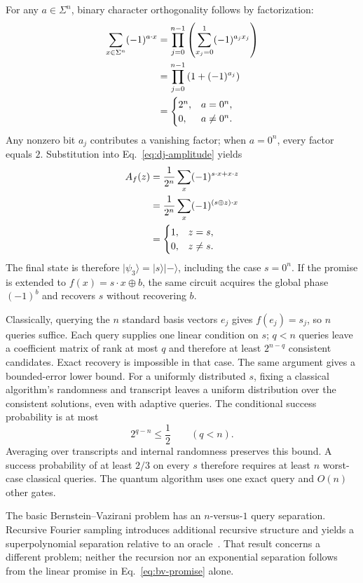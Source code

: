 \documentclass[11pt,oneside,openany]{book}
\providecommand{\ket}{}
\renewcommand{\ket}[1]{\lvert #1\rangle}
\theoremstyle{definition}
\begin{document}
For any $a\in\Sigma^n$, binary character orthogonality follows by factorization:
\begin{align}
 \sum_{x\in\Sigma^n}(-1)^{a\cdot x}
 &=\prod_{j=0}^{n-1}\left(\sum_{x_j=0}^1(-1)^{a_jx_j}\right)\notag\\
 &=\prod_{j=0}^{n-1}\left(1+(-1)^{a_j}\right)\notag\\
 &=\begin{cases}2^n,&a=0^n,\\0,&a\ne0^n.
 \end{cases}
 \label{eq:character-orthogonality}
\end{align}
Any nonzero bit $a_j$ contributes a vanishing factor; when $a=0^n$, every factor equals $2$. Substitution into Eq.~\eqref{eq:dj-amplitude} yields
\begin{align}
 A_f(z)&=\frac1{2^n}\sum_x(-1)^{s\cdot x+x\cdot z}\notag\\
 &=\frac1{2^n}\sum_x(-1)^{(s\oplus z)\cdot x}\notag\\
 &=\begin{cases}1,&z=s,\\0,&z\ne s.
 \end{cases}
\end{align}
The final state is therefore $\ket{\psi_3}=\ket s\ket-$, including the case $s=0^n$. If the promise is extended to $f(x)=s\cdot x\oplus b$, the same circuit acquires the global phase $(-1)^b$ and recovers $s$ without recovering $b$.

Classically, querying the $n$ standard basis vectors $e_j$ gives $f(e_j)=s_j$, so $n$ queries suffice. Each query supplies one linear condition on $s$; $q<n$ queries leave a coefficient matrix of rank at most $q$ and therefore at least $2^{n-q}$ consistent candidates. Exact recovery is impossible in that case. The same argument gives a bounded-error lower bound. For a uniformly distributed $s$, fixing a classical algorithm's randomness and transcript leaves a uniform distribution over the consistent solutions, even with adaptive queries. The conditional success probability is at most
\begin{equation}
 2^{q-n}\le\frac12\qquad(q<n).
\end{equation}
Averaging over transcripts and internal randomness preserves this bound. A success probability of at least $2/3$ on every $s$ therefore requires at least $n$ worst-case classical queries. The quantum algorithm uses one exact query and $O(n)$ other gates.

The basic Bernstein--Vazirani problem has an $n$-versus-$1$ query separation. Recursive Fourier sampling introduces additional recursive structure and yields a superpolynomial separation relative to an oracle~\cite{BV1997}. That result concerns a different problem; neither the recursion nor an exponential separation follows from the linear promise in Eq.~\eqref{eq:bv-promise} alone.
\end{document}
